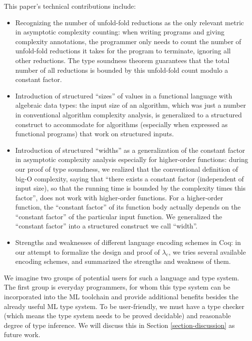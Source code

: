 \documentclass[preprint]{sigplanconf}
\newcommand{\logo}{\lambda_\mathrm{c}}
\begin{document}
This paper's technical contributions include:
\begin{itemize}
\item Recognizing the number of unfold-fold reductions as the only relevant metric in asymptotic complexity counting: when writing programs and giving complexity annotations, the programmer only needs to count the number of unfold-fold reductions it takes for the program to terminate, ignoring all other reductions. The type soundness theorem guarantees that the total number of all reductions is bounded by this unfold-fold count modulo a constant factor. 
\item Introduction of structured ``sizes'' of values in a functional language with algebraic data types: the input size of an algorithm, which was just a number in conventional algorithm complexity analysis, is generalized to a structured construct to accommodate for algorithms (especially when expressed as functional programs) that work on structured inputs.
\item Introduction of structured ``widths'' as a generalization of the constant factor in asymptotic complexity analysis especially for higher-order functions: during our proof of type soundness, we realized that the conventional definition of big-O complexity, saying that ``there exists a constant factor (independent of input size), so that the running time is bounded by the complexity times this factor'', does not work with higher-order functions. For a higher-order function, the ``constant factor'' of its function body actually depends on the ``constant factor'' of the particular input function. We generalized the ``constant factor'' into a structured construct we call ``width''.
\item Strengths and weaknesses of different language encoding schemes in Coq: in our attempt to formalize the design and proof of $\logo$, we tries several available encoding schemes, and summarized the strengths and weakness of them.
\end{itemize}

We imagine two groups of potential users for such a language and type system. The first group is everyday programmers, for whom this type system can be incorporated into the ML toolchain and provide additional benefits besides the already useful ML type system. To be user-friendly, we must have a type checker (which means the type system needs to be proved decidable) and reasonable degree of type inference. We will discuss this in Section \ref{section-discussion} as future work.
\end{document}
